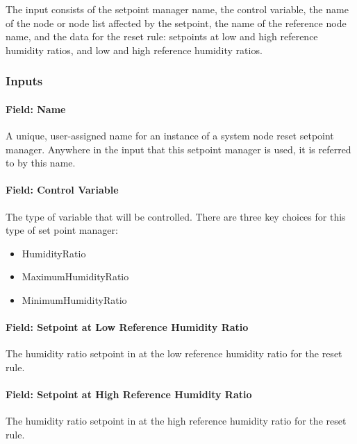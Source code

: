 The input consists of the setpoint manager name, the control variable, the name of the node or node list affected by the setpoint, the name of the reference node name, and the data for the reset rule: setpoints at low and high reference humidity ratios, and low and high reference humidity ratios.

\subsubsection{Inputs}

\paragraph{Field: Name}

A unique, user-assigned name for an instance of a system node reset setpoint manager. Anywhere in the input that this setpoint manager is used, it is referred to by this name.

\paragraph{Field: Control Variable}

The type of variable that will be controlled. There are three key choices for this type of set point manager:
\begin{itemize}
  \item HumidityRatio
  \item MaximumHumidityRatio
  \item MinimumHumidityRatio
\end{itemize}

\paragraph{Field: Setpoint at Low Reference Humidity Ratio}\label{field-setpoint-at-low-reference-humidity-ratio}

The humidity ratio setpoint in \SI{}{\humidityRatio} at the low reference humidity ratio for the reset rule.

\paragraph{Field: Setpoint at High Reference Humidity Ratio}\label{field-setpoint-at-high-reference-humidity-ratio}

The humidity ratio setpoint in \SI{}{\humidityRatio} at the high reference humidity ratio for the reset rule.

